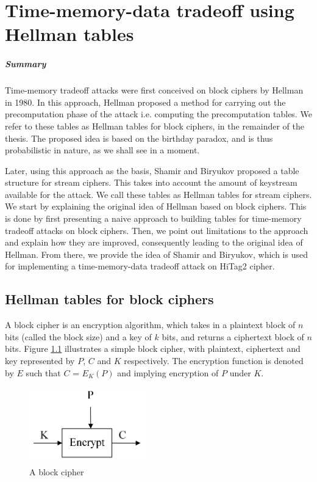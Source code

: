\chapter{Time-memory-data tradeoff using Hellman tables}
\label{chapter:tmdto-hellman}

\paragraph{Summary}



Time-memory tradeoff attacks were first conceived on block ciphers by Hellman in 1980. In this approach, Hellman proposed a method for carrying out the precomputation phase of the attack i.e. computing the precomputation tables. We refer to these tables as Hellman tables for block ciphers, in the remainder of the thesis. The proposed idea is based on the birthday paradox, and is thus probabilistic in nature, as we shall see in a moment. 

Later, using this approach as the basis, Shamir and Biryukov proposed a table structure for stream ciphers. This takes into account the amount of keystream available for the attack. We call these tables as Hellman tables for stream ciphers. We start by explaining the original idea of Hellman based on block ciphers. This is done by first presenting a naive approach to building tables for time-memory tradeoff attacks on block ciphers. Then, we point out limitations to the approach and explain how they are improved, consequently leading to the original idea of Hellman. From there, we provide the idea of Shamir and Biryukov, which is used for implementing a time-memory-data tradeoff attack on HiTag2 cipher. 

\section{Hellman tables for block ciphers}

A block cipher is an encryption algorithm, which takes in a plaintext block of $n$ bits (called the block size) and a key of $k$ bits, and returns a ciphertext block of $n$ bits. Figure \ref{fig:block-cipher} illustrates a simple block cipher, with plaintext, ciphertext and key represented by $P$, $C$ and $K$ respectively. The encryption function is denoted by $E$ such that $C$ = $E_K(P)$ and implying encryption of $P$ under $K$.

\begin{figure}[ht!]
	\centering
		\includegraphics[width=2in]{./figures/block-cipher.PNG}
	\caption{A block cipher}	
	\label{fig:block-cipher}
\end{figure}


